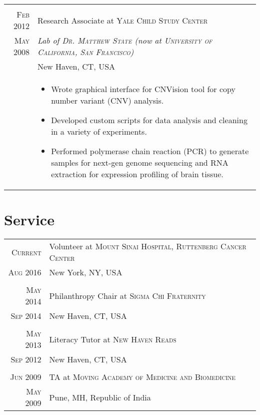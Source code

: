 \documentclass[a4paper,10pt]{article}
\begin{document}
\begin{longtable}{r|p{11cm}}
 \multicolumn{2}{c}{} \\
 \nopagebreak \textsc{Feb 2012} & Research Associate at \textsc{Yale Child Study Center} \\
 \nopagebreak \textsc{May 2008} & \small\emph{Lab of \textsc{Dr. Matthew State} (now at \textsc{University of California, San Francisco})} \\
 \nopagebreak & \small{New Haven, CT, USA} \\
 \nopagebreak & \footnotesize{
	\begin{itemize}
		\item[]{
			Wrote graphical interface for CNVision tool for copy number variant (CNV) analysis.
		}
		\item[]{
			Developed custom scripts for data analysis and cleaning in a variety of experiments.
		}
		\item[]{
			Performed polymerase chain reaction (PCR) to generate samples for next-gen
			genome sequencing and RNA extraction for expression profiling of
			brain tissue.
		}
	\end{itemize}
   }\\
\end{longtable}

\section{Service}
\begin{longtable}{r|p{11cm}}
 \nopagebreak \textsc{Current} & Volunteer at \textsc{Mount Sinai Hospital, Ruttenberg Cancer Center} \\
 \nopagebreak \textsc{Aug 2016} &  \small{New York, NY, USA}\\
 \multicolumn{2}{c}{} \\
 \nopagebreak \textsc{May 2014} & Philanthropy Chair at \textsc{Sigma Chi Fraternity}\\
 \nopagebreak \textsc{Sep 2014} & \small{New Haven, CT, USA} \\
 \multicolumn{2}{c}{} \\
 \nopagebreak \textsc{May 2013} & Literacy Tutor at \textsc{New Haven Reads}\\
 \nopagebreak \textsc{Sep 2012} & \small{New Haven, CT, USA} \\
 \multicolumn{2}{c}{} \\
 \nopagebreak \textsc{Jun 2009} & TA at \textsc{Moving Academy of Medicine and Biomedicine} \\
 \nopagebreak \textsc{May 2009} & \small{Pune, MH, Republic of India} \\
\end{longtable}
\end{document}
